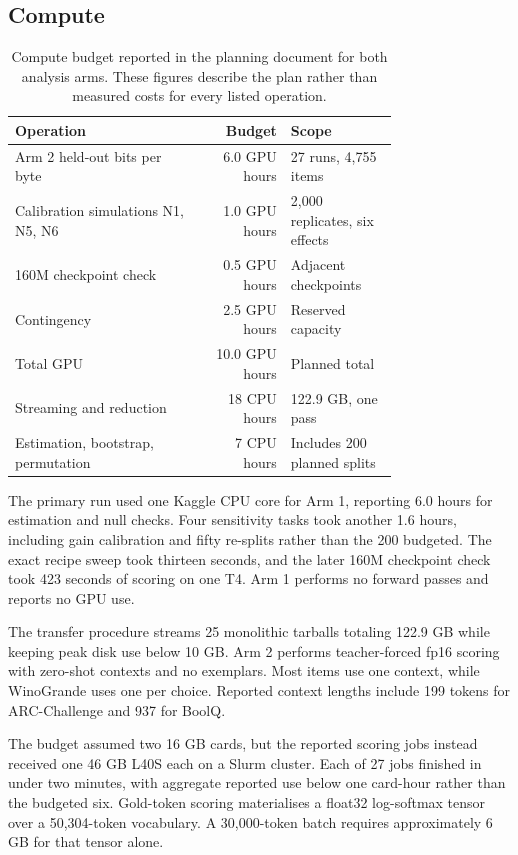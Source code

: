 \subsection{Compute}
\begin{table}[htbp]
\centering\small\setlength{\tabcolsep}{3pt}
\caption{Compute budget reported in the planning document for both analysis arms. These figures describe the plan rather than measured costs for every listed operation.}
\label{tab:original15}
\begin{tabular}{p{0.48\linewidth}rp{0.28\linewidth}}\hline
Operation & Budget & Scope\\\hline
Arm 2 held-out bits per byte & 6.0 GPU hours & 27 runs, 4,755 items\\
Calibration simulations N1, N5, N6 & 1.0 GPU hours & 2,000 replicates, six effects\\
160M checkpoint check & 0.5 GPU hours & Adjacent checkpoints\\
Contingency & 2.5 GPU hours & Reserved capacity\\
Total GPU & 10.0 GPU hours & Planned total\\
Streaming and reduction & 18 CPU hours & 122.9 GB, one pass\\
Estimation, bootstrap, permutation & 7 CPU hours & Includes 200 planned splits\\\hline
\end{tabular}
\end{table}

The primary run used one Kaggle CPU core for Arm 1, reporting 6.0 hours for estimation and null checks. Four sensitivity tasks took another 1.6 hours, including gain calibration and fifty re-splits rather than the 200 budgeted. The exact recipe sweep took thirteen seconds, and the later 160M checkpoint check took 423 seconds of scoring on one T4. Arm 1 performs no forward passes and reports no GPU use.

The transfer procedure streams 25 monolithic tarballs totaling 122.9 GB while keeping peak disk use below 10 GB. Arm 2 performs teacher-forced fp16 scoring with zero-shot contexts and no exemplars. Most items use one context, while WinoGrande uses one per choice. Reported context lengths include 199 tokens for ARC-Challenge and 937 for BoolQ.

The budget assumed two 16 GB cards, but the reported scoring jobs instead received one 46 GB L40S each on a Slurm cluster. Each of 27 jobs finished in under two minutes, with aggregate reported use below one card-hour rather than the budgeted six. Gold-token scoring materialises a float32 log-softmax tensor over a 50,304-token vocabulary. A 30,000-token batch requires approximately 6 GB for that tensor alone.

